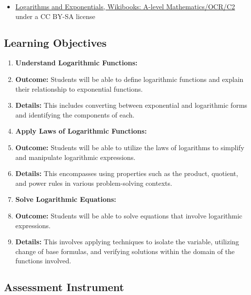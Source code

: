 \begin{itemize}
    \item \href{https://en.wikibooks.org/wiki/A-level_Mathematics/OCR/C2/Logarithms_and_Exponentials}{Logarithms and Exponentials, Wikibooks: A-level Mathematics/OCR/C2} under a CC BY-SA license
\end{itemize}


\subsection{Learning Objectives}
\label{ssec:lear-fe6e}


\begin{enumerate}
    \item \textbf{Understand Logarithmic Functions:}
    \item \textbf{Outcome:} Students will be able to define logarithmic functions and explain their relationship to exponential functions.
    \item \textbf{Details:} This includes converting between exponential and logarithmic forms and identifying the components of each.
    \item \textbf{Apply Laws of Logarithmic Functions:}
    \item \textbf{Outcome:} Students will be able to utilize the laws of logarithms to simplify and manipulate logarithmic expressions.
    \item \textbf{Details:} This encompasses using properties such as the product, quotient, and power rules in various problem-solving contexts.
    \item \textbf{Solve Logarithmic Equations:}
    \item \textbf{Outcome:} Students will be able to solve equations that involve logarithmic expressions.
    \item \textbf{Details:} This involves applying techniques to isolate the variable, utilizing change of base formulas, and verifying solutions within the domain of the functions involved.
\end{enumerate}


\subsection{Assessment Instrument}
\label{ssec:asse-3669}


